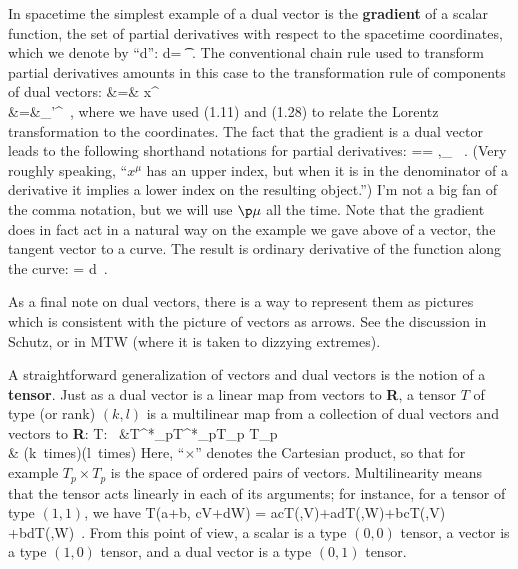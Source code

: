 \documentclass[12pt]{article}
\begin{document}
In spacetime the simplest example of a dual vector is the {\bf gradient}
of a scalar function, the set of partial derivatives with respect to the
spacetime coordinates, which we denote by ``d'':
\be
  {\rm d}\phi = {{\p{}\phi}} \t\mu\ .\label{1.40}
\ee
The conventional chain rule used to transform partial derivatives
amounts in this case to the transformation rule of components of dual
vectors:
\bea
  {{\p{}\phi}} &=&
  {{\p{}x^\mu}}{{\p{}\phi}}\nonumber \\
  &=&\Lambda_{\mu'}{}^\ ,
  \label{1.41}
\eea
where we have used (1.11) and (1.28) to relate the Lorentz transformation
to the coordinates.  The fact that the gradient is a dual vector leads
to the following shorthand notations for partial derivatives:
\be
  {{\p{}\phi}}=\p\mu\phi = \phi,{}_\mu
  \ .\label{1.42}
\ee
(Very roughly speaking, ``$x^\mu$ has an upper index, but when it is in 
the denominator of a derivative it implies a lower index on the resulting 
object.'') I'm not a big fan of the comma notation, but we will use $\p\mu$ 
all the time.  Note that the gradient does in fact act in a natural way
on the example we gave above of a vector, the tangent vector to a curve.
The result is ordinary derivative of the function along the curve:
\be
  \p\mu{}
  = {{d\phi}}\ .\label{1.43}
\ee

As a final note on dual vectors, there is a way to represent them as
pictures which is consistent with the picture of vectors as arrows.
See the discussion in Schutz, or in MTW (where it is taken to dizzying
extremes).

A straightforward generalization of vectors and dual vectors is the notion
of a {\bf tensor}.  Just as a dual vector is a linear map from vectors
to {\bf R}, a tensor $T$ of type (or rank) $(k,l)$ is a multilinear map 
from a collection of dual vectors and vectors to {\bf R}:
\bea
  T:~ &T^*_p\times\cdots\times T^*_p\times T_p\times\cdots
  \times T_p \nonumber \\
  & (k~{\rm times})\qquad\quad (l~{\rm times}) \label{1.44}
\eea
Here, ``$\times$'' denotes the Cartesian product, so that for example
$T_p\times T_p$ is the space of ordered pairs of vectors.  
Multilinearity means that the tensor acts linearly in each
of its arguments; for instance, for a tensor of type $(1,1)$, we have
\be
  T(a\omega+b\eta, cV+dW) = acT(\omega,V)+adT(\omega,W)+bcT(\eta,V)
  +bdT(\eta,W)\ .\label{1.45}
\ee
From this point of view, a scalar is a type $(0,0)$ tensor, a vector
is a type $(1,0)$ tensor, and a dual vector is a type $(0,1)$ tensor.
\end{document}
